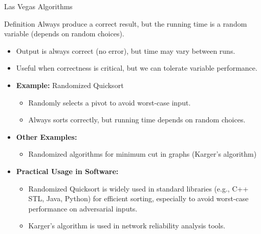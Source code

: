 \documentclass[aspectratio=169]{beamer}
\begin{document}
\begin{frame}{Las Vegas Algorithms}
\begin{block}{Definition}
  Always produce a correct result, but the running time is a random variable (depends on random choices).
\end{block}
\pause
\begin{itemize}
\item Output is always correct (no error), but time may vary between runs.
\pause
\item Useful when correctness is critical, but we can tolerate variable performance.
\pause
\item \textbf{Example:} Randomized Quicksort
\begin{itemize}
  \item Randomly selects a pivot to avoid worst-case input.
  \item Always sorts correctly, but running time depends on random choices.
\end{itemize}
\pause
\item \textbf{Other Examples:}
\begin{itemize}
  \item Randomized algorithms for minimum cut in graphs (Karger's algorithm)
\end{itemize}
\pause
\item \textbf{Practical Usage in Software:}
\begin{itemize}
            \item Randomized Quicksort is widely used in standard libraries (e.g., C++ STL, Java, Python) for efficient sorting, especially to avoid worst-case performance on adversarial inputs.
            \item Karger's algorithm is used in network reliability analysis tools.
            \end{itemize}
            \end{itemize}
            \end{frame}
\end{document}
